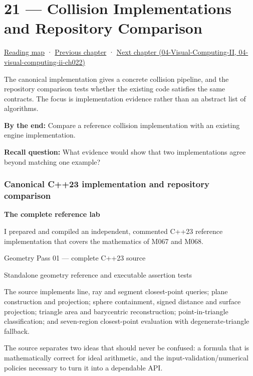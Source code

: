 \hypertarget{03-visual-computing-i-ch021}{}
\section{21 --- Collision Implementations and Repository Comparison}\label{collision-implementations-and-repository-comparison}

\href{Chapter\%20Edition/02\%20-\%20Graphics\%20Vision\%20and\%20XR/00\%20-\%20Reading\%20Map}{Reading map} · \hyperref[03-visual-computing-i-ch020]{Previous chapter} · \href{}{Next chapter (04-Visual-Computing-II, 04-visual-computing-ii-ch022)}

The canonical implementation gives a concrete collision pipeline, and the repository comparison tests whether the existing code satisfies the same contracts. The focus is implementation evidence rather than an abstract list of algorithms.

\textbf{By the end:} Compare a reference collision implementation with an existing engine implementation.

\textbf{Recall question:} What evidence would show that two implementations agree beyond matching one example?

\subsubsection{Canonical C++23 implementation and repository comparison}\label{canonical-c23-implementation-and-repository-comparison}

\textbf{The complete reference lab}

I prepared and compiled an independent, commented C++23 reference implementation that covers the mathematics of M067 and M068.

Geometry Pass 01 --- complete C++23 source

Standalone geometry reference and executable assertion tests

The source implements line, ray and segment closest-point queries; plane construction and projection; sphere containment, signed distance and surface projection; triangle area and barycentric reconstruction; point-in-triangle classification; and seven-region closest-point evaluation with degenerate-triangle fallback.

The source separates two ideas that should never be confused: a formula that is mathematically correct for ideal arithmetic, and the input-validation/numerical policies necessary to turn it into a dependable API.

